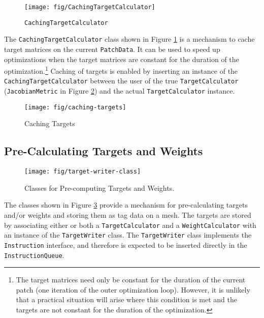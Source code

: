 \documentclass{article}
\begin{document}
\begin{figure}[htb]
\begin{center}
\texttt{[image: fig/CachingTargetCalculator]}
\caption{\texttt{CachingTargetCalculator}\label{fig:cachetarget}}
\end{center}
\end{figure}

The \texttt{CachingTargetCalculator} class shown in Figure \ref{fig:cachetarget} is a mechanism to cache target matrices on the current \texttt{PatchData}.  It can be used to speed up optimizations when the target matrices are constant for the duration of the optimization.\footnote{The target matrices need only be constant for the duration of the current patch (one iteration of the outer optimization loop).  However, it is unlikely that a practical situation will arise where this condition is met and the targets are not constant for the duration of the optimization.}  Caching of targets is enabled by inserting an instance of the \texttt{CachingTargetCalculator} between the user of the true \texttt{TargetCalculator} (\texttt{JacobianMetric} in Figure \ref{fig:usecachetarget}) and the actual \texttt{TargetCalculator} instance.

\begin{figure}[htb]
\begin{center}
\texttt{[image: fig/caching-targets]}
\caption{Caching Targets\label{fig:usecachetarget}}
\end{center}
\end{figure}


\subsection{Pre-Calculating Targets and Weights}

\begin{figure}[htb]
\begin{center}
\texttt{[image: fig/target-writer-class]}
\caption{Classes for Pre-computing Targets and Weights.\label{fig:targetwriter}}
\end{center}
\end{figure}

The classes shown in Figure \ref{fig:targetwriter} provide a mechanism for pre-calculating targets and/or weights and storing them as tag data on a mesh.  The targets are stored by associating either or both a \texttt{TargetCalculator} and a \texttt{WeightCalculator} with an instance of the \texttt{TargetWriter} class.  The \texttt{TargetWriter} class implements the \texttt{Instruction} interface, and therefore is expected to be inserted directly in the \texttt{InstructionQueue}.
\end{document}

